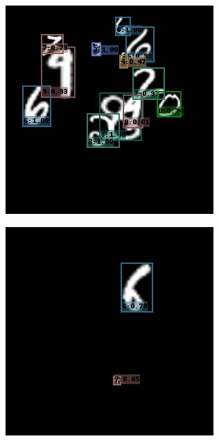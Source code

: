 \begin{figure}[h!]
\begin{subfigure}[b]{0.193\textwidth}
    \end{subfigure}
    \hfill
    \begin{subfigure}[b]{0.193\textwidth}
        \centering
        \includegraphics[width=\textwidth]{Images/mnist_output/8.png}
    \end{subfigure}
    \hfill
    \begin{subfigure}[b]{0.193\textwidth}
        \centering
        \includegraphics[width=\textwidth]{Images/mnist_output/9.png}

\end{subfigure}
\end{figure}
